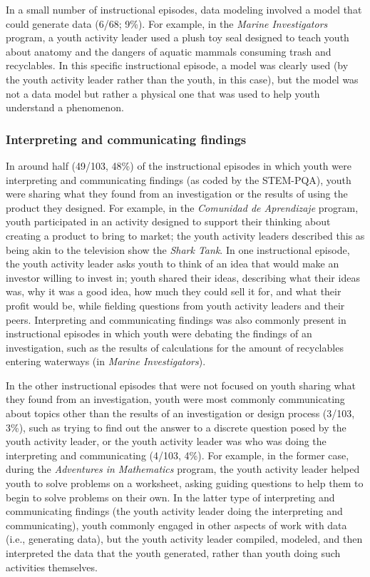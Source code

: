 \documentclass[]{msu-thesis}
\theoremstyle{definition}
\theoremstyle{definition}
\theoremstyle{definition}
\theoremstyle{remark}
\begin{document}
In a small number of instructional episodes, data modeling involved a
model that could generate data (6/68; 9\%). For example, in the
\emph{Marine Investigators} program, a youth activity leader used a
plush toy seal designed to teach youth about anatomy and the dangers of
aquatic mammals consuming trash and recyclables. In this specific
instructional episode, a model was clearly used (by the youth activity
leader rather than the youth, in this case), but the model was not a
data model but rather a physical one that was used to help youth
understand a phenomenon.

\subsubsection{Interpreting and communicating
findings}\label{interpreting-and-communicating-findings}

In around half (49/103, 48\%) of the instructional episodes in which
youth were interpreting and communicating findings (as coded by the
STEM-PQA), youth were sharing what they found from an investigation or
the results of using the product they designed. For example, in the
\emph{Comunidad de Aprendizaje} program, youth participated in an
activity designed to support their thinking about creating a product to
bring to market; the youth activity leaders described this as being akin
to the television show the \emph{Shark Tank}. In one instructional
episode, the youth activity leader asks youth to think of an idea that
would make an investor willing to invest in; youth shared their ideas,
describing what their ideas was, why it was a good idea, how much they
could sell it for, and what their profit would be, while fielding
questions from youth activity leaders and their peers. Interpreting and
communicating findings was also commonly present in instructional
episodes in which youth were debating the findings of an investigation,
such as the results of calculations for the amount of recyclables
entering waterways (in \emph{Marine Investigators}).

In the other instructional episodes that were not focused on youth
sharing what they found from an investigation, youth were most commonly
communicating about topics other than the results of an investigation or
design process (3/103, 3\%), such as trying to find out the answer to a
discrete question posed by the youth activity leader, or the youth
activity leader was who was doing the interpreting and communicating
(4/103, 4\%). For example, in the former case, during the
\emph{Adventures in Mathematics} program, the youth activity leader
helped youth to solve problems on a worksheet, asking guiding questions
to help them to begin to solve problems on their own. In the latter type
of interpreting and communicating findings (the youth activity leader
doing the interpreting and communicating), youth commonly engaged in
other aspects of work with data (i.e., generating data), but the youth
activity leader compiled, modeled, and then interpreted the data that
the youth generated, rather than youth doing such activities themselves.
\end{document}
